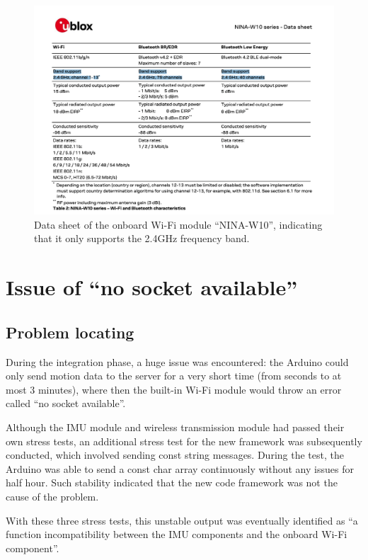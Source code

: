 \begin{figure}[htbp]
	\centering
	\includegraphics[width=\textwidth]{
		fileForWriting/wifinina}
	\caption[Data sheet of the onboard Wi-Fi module ``NINA-W10'']{Data sheet of the onboard Wi-Fi module ``NINA-W10'', indicating that it only supports the 2.4GHz frequency band.}
	\label{fig:2.4Gonly}
\end{figure}


\section{Issue of ``no socket available''}
\subsection{Problem locating}
During the integration phase, a huge issue was encountered: the Arduino could only send motion data to the server for a very short time (from seconds to at most 3 minutes), where then the built-in Wi-Fi module would throw an error called ``no socket available''.

Although the IMU module and wireless transmission module had passed their own stress tests, an additional stress test for the new framework was subsequently conducted, which involved sending const string messages.
During the test, the Arduino was able to send a const char array continuously without any issues for half hour.
Such stability indicated that the new code framework was not the cause of the problem.

With these three stress tests, this unstable output was eventually identified as ``a function incompatibility between the IMU components and the onboard Wi-Fi component''.


